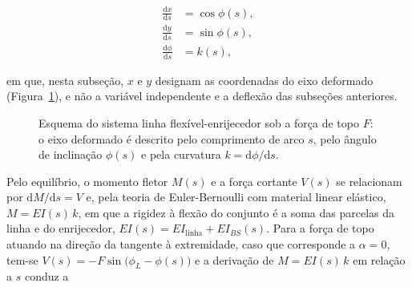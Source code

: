 \documentclass[arial,centeredequations,english,brazilian,oneside,section=TITLE]{ifes8}
\begin{document}
\begin{align}
  \frac{\mathrm{d}x}{\mathrm{d}s} &= \cos\phi(s), \label{eq:geo-x}\\
  \frac{\mathrm{d}y}{\mathrm{d}s} &= \sin\phi(s), \label{eq:geo-y}\\
  \frac{\mathrm{d}\phi}{\mathrm{d}s} &= k(s), \label{eq:geo-phi}
\end{align}

em que, nesta subseção, $x$ e $y$ designam as coordenadas do eixo deformado
(Figura~\ref{fig:esquema-enrijecedor}), e não a variável independente e a deflexão das
subseções anteriores.
 
\begin{figure}[h]
  \centering
  \caption{Esquema do sistema linha flexível-enrijecedor sob a força de topo $F$: o eixo
    deformado é descrito pelo comprimento de arco $s$, pelo ângulo de inclinação $\phi(s)$
    e pela curvatura $k = \mathrm{d}\phi/\mathrm{d}s$.}
  \label{fig:esquema-enrijecedor}
\end{figure}
 
Pelo equilíbrio, o momento fletor $M(s)$ e a força cortante $V(s)$ se relacionam por
$\mathrm{d}M/\mathrm{d}s = V$ e, pela teoria de Euler-Bernoulli
com material linear elástico, $M = EI(s)\,k$, em que a rigidez à flexão do conjunto é a
soma das parcelas da linha e do enrijecedor, $EI(s) = EI_{\mathrm{linha}} +
EI_{BS}(s)$. Para a força de topo atuando na direção da tangente
à extremidade, caso que corresponde a $\alpha = 0$,
tem-se $V(s) = -F\sin\!\big(\phi_L - \phi(s)\big)$ e a derivação de $M = EI(s)\,k$ em
relação a $s$ conduz a
\end{document}

